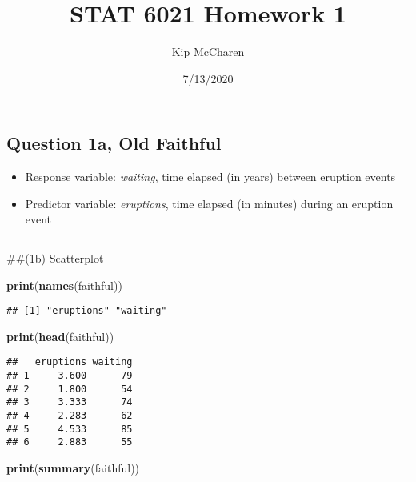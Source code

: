 \documentclass[
]{article}
\title{STAT 6021 Homework 1}
\author{Kip McCharen}
\date{7/13/2020}
\newenvironment{Shaded}{\begin{snugshade}}{\end{snugshade}}
\newcommand{\KeywordTok}[1]{\textcolor[rgb]{0.13,0.29,0.53}{\textbf{#1}}}
\newcommand{\NormalTok}[1]{#1}
\providecommand{\tightlist}{%
  \setlength{\itemsep}{0pt}\setlength{\parskip}{0pt}}
\begin{document}
\maketitle

\hypertarget{question-1a-old-faithful}{%
\subsection{Question 1a, Old Faithful}\label{question-1a-old-faithful}}

\begin{itemize}
\tightlist
\item
  Response variable: \emph{waiting}, time elapsed (in years) between
  eruption events
\item
  Predictor variable: \emph{eruptions}, time elapsed (in minutes) during
  an eruption event
\end{itemize}

\begin{center}\rule{0.5\linewidth}{0.5pt}\end{center}

\#\#(1b) Scatterplot

\begin{Shaded}
\begin{Highlighting}[]
\KeywordTok{print}\NormalTok{(}\KeywordTok{names}\NormalTok{(faithful))}
\end{Highlighting}
\end{Shaded}

\begin{verbatim}
## [1] "eruptions" "waiting"
\end{verbatim}

\begin{Shaded}
\begin{Highlighting}[]
\KeywordTok{print}\NormalTok{(}\KeywordTok{head}\NormalTok{(faithful))}
\end{Highlighting}
\end{Shaded}

\begin{verbatim}
##   eruptions waiting
## 1     3.600      79
## 2     1.800      54
## 3     3.333      74
## 4     2.283      62
## 5     4.533      85
## 6     2.883      55
\end{verbatim}

\begin{Shaded}
\begin{Highlighting}[]
\KeywordTok{print}\NormalTok{(}\KeywordTok{summary}\NormalTok{(faithful))}
\end{Highlighting}
\end{Shaded}
\end{document}

